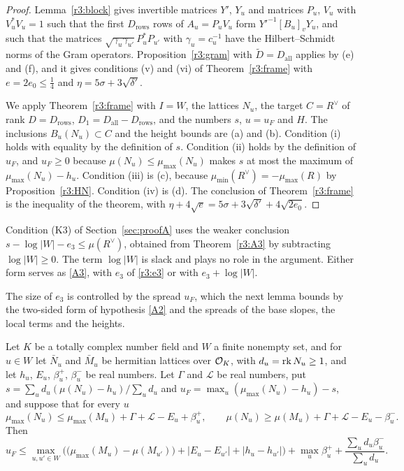 \begin{proof}
Lemma~\ref{r3:block} gives invertible matrices $Y'$, $Y_u$ and matrices $P_u$, $V_u$ with $V_u^*V_u=1$ such that the first $D_{\mathrm{rows}}$ rows of $A_u=P_uV_u$ form $Y'^{-1}[B_u]_vY_u$, and such that the matrices $\sqrt{\gamma_u\gamma_{u'}}P_u^*P_{u'}$ with $\gamma_u=c_u^{-1}$ have the Hilbert--Schmidt norms of the Gram operators. Proposition~\ref{r3:gram} with $\widetilde D=D_{\mathrm{all}}$ applies by (e) and (f), and it gives conditions (v) and (vi) of Theorem~\ref{r3:frame} with $e=2e_0\le\frac14$ and $\eta=5\sigma+3\sqrt{\delta'}$.

We apply Theorem~\ref{r3:frame} with $I=W$, the lattices $N_u$, the target $C=R^\vee$ of rank $D=D_{\mathrm{rows}}$, $D_1=D_{\mathrm{all}}-D_{\mathrm{rows}}$, and the numbers $s$, $u=u_F$ and $H$. The inclusions $B_u(N_u)\subset C$ and the height bounds are (a) and (b). Condition (i) holds with equality by the definition of $s$. Condition (ii) holds by the definition of $u_F$, and $u_F\ge0$ because $\mu(N_u)\le\mu_{\max}(N_u)$ makes $s$ at most the maximum of $\mu_{\max}(N_u)-h_u$. Condition (iii) is (c), because $\mu_{\min}(R^\vee)=-\mu_{\max}(R)$ by Proposition~\ref{r3:HN}. Condition (iv) is (d). The conclusion of Theorem~\ref{r3:frame} is the inequality of the theorem, with $\eta+4\sqrt e=5\sigma+3\sqrt{\delta'}+4\sqrt{2e_0}$.
\end{proof}

\begin{remark}\label{r3:rem:log}
Condition (K3) of Section~\ref{sec:proofA} uses the weaker conclusion $s-\log\lvert W\rvert-e_3\le\mu(R^\vee)$, obtained from Theorem~\ref{r3:A3} by subtracting $\log\lvert W\rvert\ge0$. The term $\log\lvert W\rvert$ is slack and plays no role in the argument. Either form serves as \eqref{A3}, with $e_3$ of \eqref{r3:e3} or with $e_3+\log\lvert W\rvert$.
\end{remark}

The size of $e_3$ is controlled by the spread $u_F$, which the next lemma bounds by the two-sided form of hypothesis \eqref{A2} and the spreads of the base slopes, the local terms and the heights.

\begin{lemma}\label{r3:uF}
Let $K$ be a totally complex number field and $W$ a finite nonempty set, and for $u\in W$ let $\bar N_u$ and $\bar M_u$ be hermitian lattices over $\mathcal O_K$, with $d_u=\operatorname{rk} N_u\ge1$, and let $h_u$, $E_u$, $\beta_u^+$, $\beta_u^-$ be real numbers. Let $\Gamma$ and $\mathcal L$ be real numbers, put $s=\sum_ud_u(\mu(N_u)-h_u)/\sum_ud_u$ and $u_F=\max_u(\mu_{\max}(N_u)-h_u)-s$, and suppose that for every $u$
\[
\mu_{\max}(N_u)\le\mu_{\max}(M_u)+\Gamma+\mathcal L-E_u+\beta^+_u,\qquad\mu(N_u)\ge\mu(M_u)+\Gamma+\mathcal L-E_u-\beta^-_u .
\]
Then
\[
u_F\le\max_{u,u'\in W}\Big(\big(\mu_{\max}(M_u)-\mu(M_{u'})\big)+\lvert E_u-E_{u'}\rvert+\lvert h_u-h_{u'}\rvert\Big)+\max_u\beta^+_u+\frac{\sum_ud_u\beta^-_u}{\sum_ud_u}.
\]
\end{lemma}

